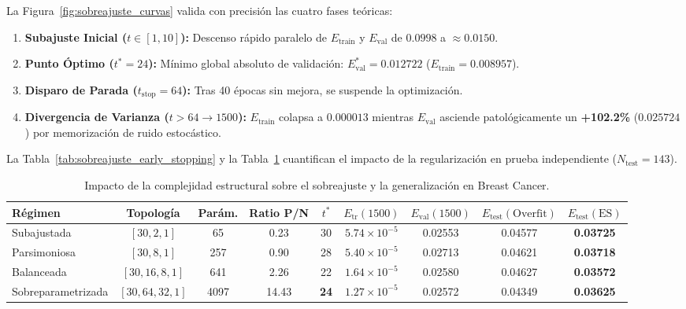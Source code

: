 \documentclass{article}
\begin{document}
La Figura~\ref{fig:sobreajuste_curvas} valida con precisión las cuatro fases teóricas:
\begin{enumerate}
    \item \textbf{Subajuste Inicial ($t \in [1, 10]$):} Descenso rápido paralelo de $E_{\text{train}}$ y $E_{\text{val}}$ de $0.0998$ a $\approx 0.0150$.
    \item \textbf{Punto Óptimo ($t^* = 24$):} Mínimo global absoluto de validación: $E_{\text{val}}^* = 0.012722$ ($E_{\text{train}} = 0.008957$).
    \item \textbf{Disparo de Parada ($t_{\text{stop}} = 64$):} Tras 40 épocas sin mejora, se suspende la optimización.
    \item \textbf{Divergencia de Varianza ($t > 64 \to 1500$):} $E_{\text{train}}$ colapsa a $0.000013$ mientras $E_{\text{val}}$ asciende patológicamente un \textbf{+102.2\%} ($0.025724$) por memorización de ruido estocástico.
\end{enumerate}

La Tabla~\ref{tab:sobreajuste_early_stopping} y la Tabla~\ref{tab:complejidad_arquitecturas} cuantifican el impacto de la regularización en prueba independiente ($N_{\text{test}}=143$).



\begin{table}[H]
\centering
\small
\caption{Impacto de la complejidad estructural sobre el sobreajuste y la generalización en Breast Cancer.}
\label{tab:complejidad_arquitecturas}
\begin{tabularx}{\textwidth}{l c c c c c c c c}
\toprule
\textbf{Régimen} & \textbf{Topología} & \textbf{Parám.} & \textbf{Ratio P/N} & $t^*$ & $E_{\text{tr}}(1500)$ & $E_{\text{val}}(1500)$ & $E_{\text{test}}(\text{Overfit})$ & $E_{\text{test}}(\text{ES})$ \\
\midrule
Subajustada & $[30, 2, 1]$ & 65 & 0.23 & 30 & $5.74 \times 10^{-5}$ & 0.02553 & 0.04577 & \textbf{0.03725} \\
Parsimoniosa & $[30, 8, 1]$ & 257 & 0.90 & 28 & $5.40 \times 10^{-5}$ & 0.02713 & 0.04621 & \textbf{0.03718} \\
Balanceada & $[30, 16, 8, 1]$ & 641 & 2.26 & 22 & $1.64 \times 10^{-5}$ & 0.02580 & 0.04627 & \textbf{0.03572} \\
Sobreparametrizada & $[30, 64, 32, 1]$ & 4097 & 14.43 & \textbf{24} & $1.27 \times 10^{-5}$ & 0.02572 & 0.04349 & \textbf{0.03625} \\
\bottomrule
\end{tabularx}
\end{table}
\end{document}
